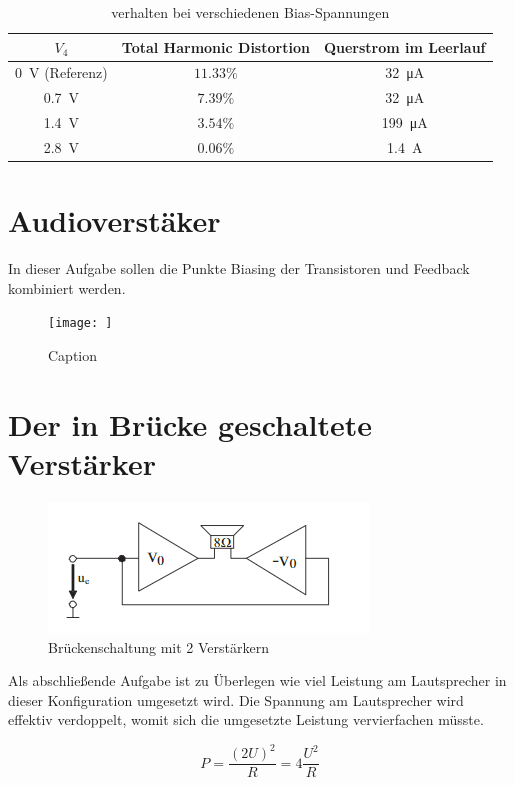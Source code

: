 \begin{table}[H]
    \centering
    \begin{tabular}{|c||c|c|}\hline
         $V_4$ & Total Harmonic Distortion & Querstrom im Leerlauf  \\ \hline \hline
         \SI{0}{\volt} (Referenz)& $11.33\%$ & \SI{32}{\micro \ampere} \\ \hline
         \SI{0.7}{\volt}& $7.39\%$ & \SI{32}{\micro \ampere} \\ \hline
         \SI{1.4}{\volt}& $3.54\%$ & \SI{199}{\micro \ampere} \\ \hline
         \SI{2.8}{\volt}& $0.06\%$ & \SI{1.4}{\ampere} \\ \hline
    \end{tabular} 
    \caption{verhalten bei verschiedenen Bias-Spannungen}
    \label{tab:my_label}
\end{table}

\section{Audioverstäker}

In dieser Aufgabe sollen die Punkte Biasing der Transistoren und Feedback kombiniert werden.

\begin{figure}
    \centering
    \texttt{[image: ]}
    \caption{Caption}
    \label{fig:my_label}
\end{figure}

\section{Der in Brücke geschaltete Verstärker}

\begin{figure}[H]
    \centering
    \includegraphics{tex/7_Leistungsverstaerker/pictures/Bridgeamp.png}
    \caption{Brückenschaltung mit 2 Verstärkern}
    \label{fig:my_label}
\end{figure}

Als abschließende Aufgabe ist zu Überlegen wie viel Leistung am Lautsprecher in dieser Konfiguration umgesetzt wird. Die Spannung am Lautsprecher wird effektiv verdoppelt, womit sich die umgesetzte Leistung vervierfachen müsste. 

\begin{equation*}
    P = \frac{(2 U)^2}{R} = 4 \frac{U^2}{R}
\end{equation*}